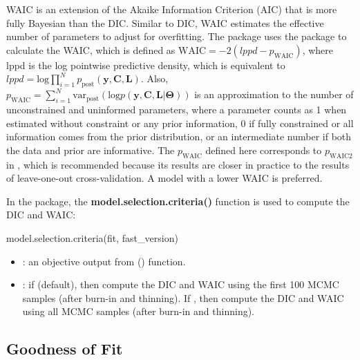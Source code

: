 WAIC is an extension of the Akaike Information Criterion (AIC) that is more fully Bayesian than the DIC. Similar to DIC, WAIC estimates the effective number of parameters to adjust for overfitting. The  package uses the  package \citep{Hall2022} to calculate the WAIC, which is defined as $ \text{WAIC} = -2(lppd - p_{\text{WAIC}}) $, where lppd is the log pointwise predictive density, which is equivalent to $lppd=\text{log}\prod_{i=1}^Np_{\text{post}}(\boldsymbol{y},\boldsymbol{C},\boldsymbol{L})$. Also, $p_{\text{WAIC}} = \sum_{i=1}^N \text{var}_{\text{post}} (\text{log}p(\boldsymbol{y},\boldsymbol{C},\boldsymbol{L}|\boldsymbol{\Theta})) $ is an approximation to the number of unconstrained and uninformed parameters, where a parameter counts as 1 when estimated without constraint or any prior information, 0 if fully constrained or all information comes from the prior distribution, or an intermediate number if both the data and prior are informative. The $p_{\text{WAIC}}$ defined here corresponds to $p_{\text{WAIC2}}$ in \citet{Gelman2014a}, which is recommended because its results are closer in practice to the results of leave-one-out cross-validation. A model with a lower WAIC is preferred.

In the  package, the \textbf{model.selection.criteria()} function is used to compute the DIC and WAIC: 

\begin{example}
model.selection.criteria(fit, fast_version)
\end{example}

\begin{itemize}

	\item {}: an objective output from () function.  

	\item {}: if   (default), then compute the DIC and WAIC using the first 100 MCMC samples (after burn-in and thinning). If  , then compute the DIC and WAIC using all MCMC samples (after burn-in and thinning). 

\end{itemize}

\subsection{Goodness of Fit}

